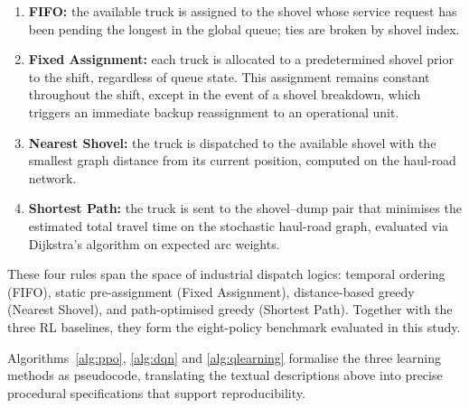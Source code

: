 \documentclass[11pt,a4paper]{article}
\begin{document}
\begin{enumerate}
  \item \textbf{FIFO:} the available truck is assigned to the shovel whose service request has been pending the longest in the global queue; ties are broken by shovel index.
  \item \textbf{Fixed Assignment:} each truck is allocated to a predetermined shovel prior to the shift, regardless of queue state. This assignment remains constant throughout the shift, except in the event of a shovel breakdown, which triggers an immediate backup reassignment to an operational unit.
  \item \textbf{Nearest Shovel:} the truck is dispatched to the available shovel with the smallest graph distance from its current position, computed on the haul-road network.
  \item \textbf{Shortest Path:} the truck is sent to the shovel--dump pair that minimises the estimated total travel time on the stochastic haul-road graph, evaluated via Dijkstra's algorithm on expected arc weights.
\end{enumerate}

These four rules span the space of industrial dispatch logics: temporal ordering (FIFO), static pre-assignment (Fixed Assignment), distance-based greedy (Nearest Shovel), and path-optimised greedy (Shortest Path). Together with the three RL baselines, they form the eight-policy benchmark evaluated in this study.

Algorithms~\ref{alg:ppo}, \ref{alg:dqn} and \ref{alg:qlearning} formalise the three learning methods as pseudocode, translating the textual descriptions above into precise procedural specifications that support reproducibility.
\end{document}
